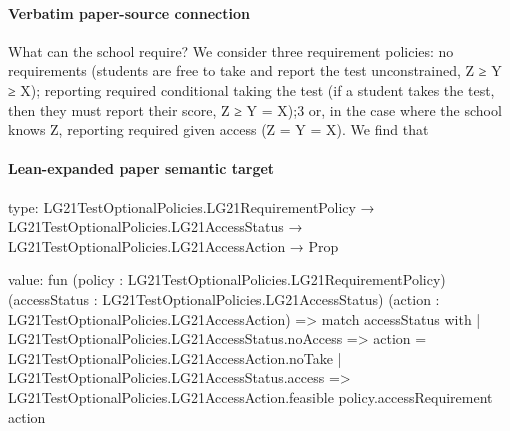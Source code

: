 \documentclass[10pt]{article}
\begin{document}
\paragraph{Verbatim paper-source connection}
\begin{ReviewVerbatim}
What can the school require? We consider three requirement policies: no requirements (students
are free to take and report the test unconstrained, Z ≥ Y ≥ X); reporting required conditional
taking the test (if a student takes the test, then they must report their score, Z ≥ Y = X);3 or, in
the case where the school knows Z, reporting required given access (Z = Y = X). We ﬁnd that
\end{ReviewVerbatim}



\paragraph{Lean-expanded paper semantic target}
\begin{ReviewVerbatim}
type:
LG21TestOptionalPolicies.LG21RequirementPolicy →
  LG21TestOptionalPolicies.LG21AccessStatus → LG21TestOptionalPolicies.LG21AccessAction → Prop

value:
fun (policy : LG21TestOptionalPolicies.LG21RequirementPolicy) (accessStatus : LG21TestOptionalPolicies.LG21AccessStatus)
    (action : LG21TestOptionalPolicies.LG21AccessAction) =>
  match accessStatus with
  | LG21TestOptionalPolicies.LG21AccessStatus.noAccess => action = LG21TestOptionalPolicies.LG21AccessAction.noTake
  | LG21TestOptionalPolicies.LG21AccessStatus.access =>
    LG21TestOptionalPolicies.LG21AccessAction.feasible policy.accessRequirement action
\end{ReviewVerbatim}
\end{document}
